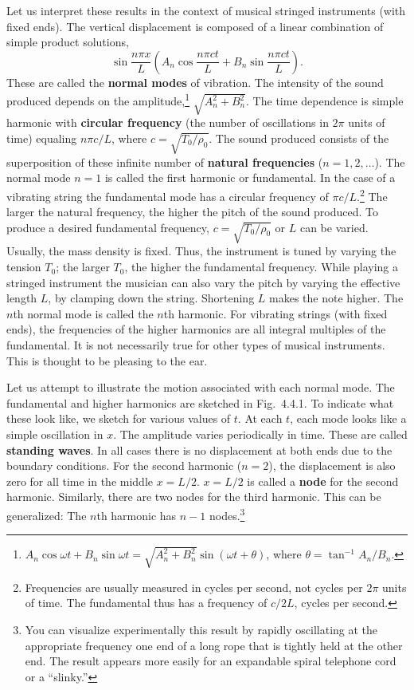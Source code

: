 Let us interpret these results in the context of musical stringed instruments (with fixed ends).  The vertical displacement is composed of a linear combination of simple product solutions,
\[
\sin\frac{n\pi x}{L}\left(A_n\cos\frac{n\pi ct}{L} + B_n\sin\frac{n\pi ct}{L}\right).
\]
These are called the \textbf{normal modes} of vibration.  The intensity of the sound produced depends on the amplitude,\footnote{$A_n\cos\omega t + B_n\sin\omega t = \sqrt{A_n^2+B_n^2}\sin(\omega t + \theta)$, where $\theta = \tan^{-1}A_n/B_n$.} $\sqrt{A_n^2+B_n^2}$.  The time dependence is simple harmonic with \textbf{circular frequency} (the number of oscillations in $2\pi$ units of time) equaling $n\pi c/L$, where $c = \sqrt{T_0/\rho_0}$.  The sound produced consists of the superposition of these infinite number of \textbf{natural frequencies} ($n = 1, 2, \ldots$).  The normal mode $n = 1$ is called the first harmonic or fundamental.  In the case of a vibrating string the fundamental mode has a circular frequency of $\pi c/L$.\footnote{Frequencies are usually measured in cycles per second, not cycles per $2\pi$ units of time.  The fundamental thus has a frequency of $c/2L$, cycles per second.}  The larger the natural frequency, the higher the pitch of the sound produced.  To produce a desired fundamental frequency, $c = \sqrt{T_0/\rho_0}$ or $L$ can be varied.  Usually, the mass density is fixed.  Thus, the instrument is tuned by varying the tension $T_0$; the larger $T_0$, the higher the fundamental frequency.  While playing a stringed instrument the musician can also vary the pitch by varying the effective length $L$, by clamping down the string.  Shortening $L$ makes the note higher.  The $n$th normal mode is called the $n$th harmonic.  For vibrating strings (with fixed ends), the frequencies of the higher harmonics are all integral multiples of the fundamental.  It is not necessarily true for other types of musical instruments.  This is thought to be pleasing to the ear.

Let us attempt to illustrate the motion associated with each normal mode.  The fundamental and higher harmonics are sketched in Fig.~4.4.1.  To indicate what these look like, we sketch for various values of $t$.  At each $t$, each mode looks like a simple oscillation in $x$.  The amplitude varies periodically in time.  These are called \textbf{standing waves}.  In all cases there is no displacement at both ends due to the boundary conditions.  For the second harmonic ($n=2$), the displacement is also zero for all time in the middle $x = L/2$.  $x = L/2$ is called a \textbf{node} for the second harmonic.  Similarly, there are two nodes for the third harmonic.  This can be generalized: The $n$th harmonic has $n-1$ nodes.\footnote{You can visualize experimentally this result by rapidly oscillating at the appropriate frequency one end of a long rope that is tightly held at the other end.  The result appears more easily for an expandable spiral telephone cord or a ``slinky.''}

